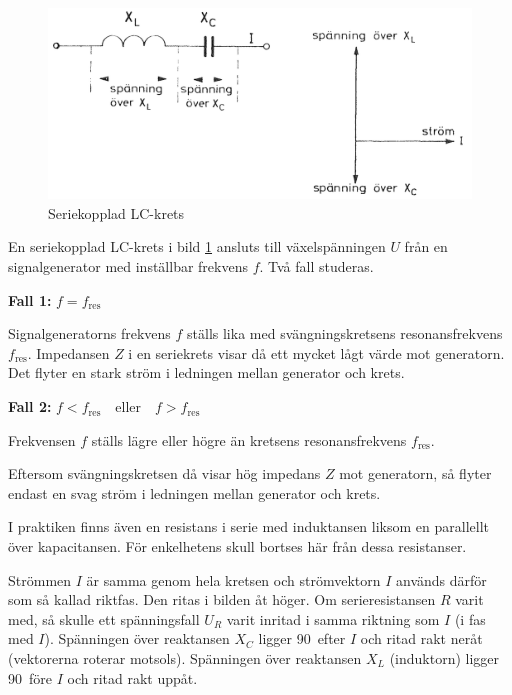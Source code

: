 \begin{figure}
\includegraphics[width=\textwidth]{images/cropped_pdfs/bild_2_3-16.pdf}
\caption{Seriekopplad LC-krets}
\label{fig:BildII3-16}
\end{figure}

En seriekopplad LC-krets i bild \ref{fig:BildII3-16} ansluts till
växelspänningen \(U\) från en signalgenerator med inställbar frekvens \(f\).
Två fall studeras.

\textbf{Fall 1:} \(f = f_{\text{res}}\)

Signalgeneratorns frekvens \(f\) ställs lika med svängningskretsens
resonansfrekvens \(f_{\text{res}}\).
Impedansen \(Z\) i en seriekrets visar då ett mycket lågt värde mot generatorn.
Det flyter en stark ström i ledningen mellan generator och krets.

\textbf{Fall 2:} \(f < f_{\text{res}} \quad \text{eller} \quad f > 
f_{\text{res}}\)

Frekvensen \(f\) ställs lägre eller högre än kretsens resonansfrekvens
\(f_{\text{res}}\).

Eftersom svängningskretsen då visar hög impedans \(Z\) mot generatorn, så
flyter endast en svag ström i ledningen mellan generator och krets.

I praktiken finns även en resistans i serie med induktansen liksom en
parallellt över kapacitansen.
För enkelhetens skull bortses här från dessa resistanser.

Strömmen \(I\) är samma genom hela kretsen och strömvektorn \(I\) används
därför som så kallad riktfas.
Den ritas i bilden åt höger.
Om serieresistansen \(R\) varit med, så skulle ett spänningsfall \(U_R\) varit
inritad i samma riktning som \(I\) (i fas med \(I\)).
Spänningen över reaktansen \(X_C\) ligger 90\degree~efter \(I\) och ritad
rakt neråt (vektorerna roterar motsols).
Spänningen över reaktansen \(X_L\) (induktorn) ligger 90\degree~före \(I\) och
ritad rakt uppåt.

